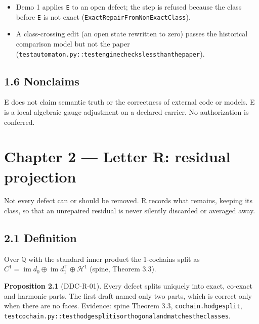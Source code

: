 \documentclass[
  11pt,
]{article}
\newenvironment{Shaded}{}{}
\newcommand{\NormalTok}[1]{#1}
\providecommand{\tightlist}{%
  \setlength{\itemsep}{0pt}\setlength{\parskip}{0pt}}
\renewcommand{\_}{\ddcunderscore\allowbreak}
\begin{document}
\begin{itemize}
\tightlist
\item
  Demo 1 applies \texttt{E} to an open defect; the step is refused
  because the class before \texttt{E} is not exact
  (\texttt{Exact\allowbreak Repair\allowbreak From\allowbreak Non\allowbreak Exact\allowbreak Class}).
\item
  A class-crossing edit (an open state rewritten to zero) passes the
  historical comparison model but not the paper
  (\texttt{test\_automaton.\allowbreak py::test\_engine\_checks\_less\_than\_the\_paper}).
\end{itemize}

\subsection{1.6 Nonclaims}\label{nonclaims}

\begin{Shaded}
\begin{Highlighting}[]
\NormalTok{E does not claim semantic truth or the correctness of external code or models.}
\NormalTok{E is a local algebraic gauge adjustment on a declared carrier.}
\NormalTok{No authorization is conferred.}
\end{Highlighting}
\end{Shaded}

\section{Chapter 2 --- Letter R: residual projection}\label{chapter-2}

Not every defect can or should be removed. R records what remains,
keeping its class, so that an unrepaired residual is never silently
discarded or averaged away.

\subsection{2.1 Definition}\label{definition-2}

Over \(\mathbb{Q}\) with the standard inner product the 1-cochains split
as
\(C^1 = \operatorname{im} d_0 \oplus \operatorname{im} d_1^{\top} \oplus
\mathcal{H}^1\) (spine, Theorem 3.3).

\textbf{Proposition 2.1} (DDC-R-01). Every defect splits uniquely into
exact, co-exact and harmonic parts. The first draft named only two
parts, which is correct only when there are no faces. Evidence: spine
Theorem 3.3, \texttt{cochain.\allowbreak hodge\_split},
\texttt{test\_cochain.\allowbreak py::test\_hodge\_split\_is\_orthogonal\_and\_matches\_the\_classes}.
\end{document}
